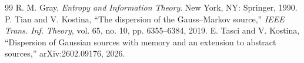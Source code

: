 \documentclass[11pt,onecolumn]{IEEEtran}
\begin{document}
\begin{thebibliography}{99}
 R. M. Gray, \emph{Entropy and Information Theory}.
New York, NY: Springer, 1990.
 P. Tian and V. Kostina, ``The dispersion of the
Gauss--Markov source,'' \emph{IEEE Trans. Inf. Theory}, vol. 65, no. 10,
pp. 6355--6384, 2019.
 E. Tasci and V. Kostina, ``Dispersion of Gaussian
sources with memory and an extension to abstract sources,''
arXiv:2602.09176, 2026.

\end{thebibliography}
\end{document}
